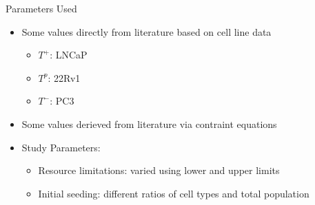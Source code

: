 \begin{frame}{Parameters Used}
\begin{itemize}
  \item<1-> Some values directly from literature based on cell line data \cite{Jain, HailJr}
  \begin{itemize}
    \item $T^+$: LNCaP
    \item $T^p$: 22Rv1
    \item $T^-$: PC3
  \end{itemize}
  \item<2-> Some values derieved from literature via contraint equations \cite{atcc, Steward, Titus}
  \item<3-> Study Parameters:
    \begin{itemize}
      \item Resource limitations: varied using lower and upper limits
      \item Initial seeding: different ratios of cell types and total population
    \end{itemize}
\end{itemize}

\end{frame}
